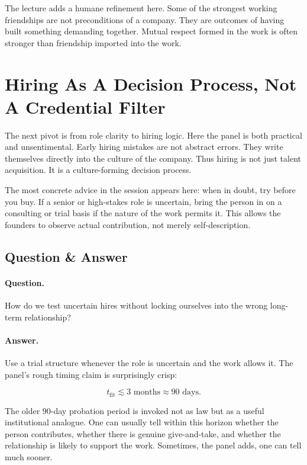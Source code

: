 The lecture adds a humane refinement here. Some of the strongest working friendships are not preconditions of a company. They are outcomes of having built something demanding together. Mutual respect formed in the work is often stronger than friendship imported into the work.

\section{Hiring As A Decision Process, Not A Credential Filter}

The next pivot is from role clarity to hiring logic. Here the panel is both practical and unsentimental. Early hiring mistakes are not abstract errors. They write themselves directly into the culture of the company. Thus hiring is not just talent acquisition. It is a culture-forming decision process.

The most concrete advice in the session appears here: when in doubt, try before you buy. If a senior or high-stakes role is uncertain, bring the person in on a consulting or trial basis if the nature of the work permits it. This allows the founders to observe actual contribution, not merely self-description.

\subsection{Question \& Answer}

\paragraph{Question.} How do we test uncertain hires without locking ourselves into the wrong long-term relationship?

\paragraph{Answer.} Use a trial structure whenever the role is uncertain and the work allows it. The panel's rough timing claim is surprisingly crisp:

\begin{equation}
t_{\mathrm{fit}} \lesssim 3\text{ months} \approx 90\text{ days}.
\end{equation}

The older \(90\)-day probation period is invoked not as law but as a useful institutional analogue. One can usually tell within this horizon whether the person contributes, whether there is genuine give-and-take, and whether the relationship is likely to support the work. Sometimes, the panel adds, one can tell much sooner.

